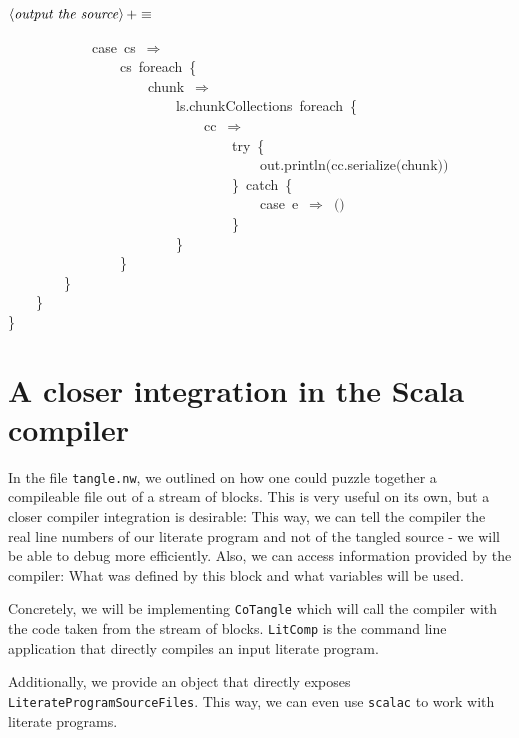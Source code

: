 \documentclass[a4paper,12pt]{article}
\begin{document}
$\left<\mbox{\emph{output the source}}\right>+\equiv$
\begin{program}~~~~~~~~~~~~{\vem case}~cs~$\Rightarrow$
\\~~~~~~~~~~~~~~~~cs~foreach~{\small\{}
\\~~~~~~~~~~~~~~~~~~~~chunk~$\Rightarrow$
\\~~~~~~~~~~~~~~~~~~~~~~~~ls.chunkCollections~foreach~{\small\{}
\\~~~~~~~~~~~~~~~~~~~~~~~~~~~~cc~$\Rightarrow$
\\~~~~~~~~~~~~~~~~~~~~~~~~~~~~~~~~{\vem try}~{\small\{}
\\~~~~~~~~~~~~~~~~~~~~~~~~~~~~~~~~~~~~out.println$($cc.serialize$($chunk$)$$)$
\\~~~~~~~~~~~~~~~~~~~~~~~~~~~~~~~~{\small\}}~{\vem catch}~{\small\{}
\\~~~~~~~~~~~~~~~~~~~~~~~~~~~~~~~~~~~~{\vem case}~e~$\Rightarrow$~$($$)$
\\~~~~~~~~~~~~~~~~~~~~~~~~~~~~~~~~{\small\}}
\\~~~~~~~~~~~~~~~~~~~~~~~~{\small\}}
\\~~~~~~~~~~~~~~~~{\small\}}
\\~~~~~~~~{\small\}}
\\~~~~{\small\}}
\\{\small\}}
\end{program}
\section{A closer integration in the Scala compiler}
In the file \texttt{tangle.nw}, we outlined on how one could puzzle together a
compileable file out of a stream of blocks. This is very useful on its own,
but a closer compiler integration is desirable: This way, we can tell the
compiler the real line numbers of our literate program and not of the tangled
source - we will be able to debug more efficiently. Also, we can access
information provided by the compiler: What was defined by this block and
what variables will be used.

Concretely, we will be implementing \texttt{CoTangle} which will call the
compiler with the code taken from the stream of blocks. \texttt{LitComp} is
the command line application that directly compiles an input literate
program.

Additionally, we provide an object that directly exposes
\texttt{LiterateProgramSourceFiles}. This way, we can even use \texttt{scalac} to
work with literate programs.
\end{document}
